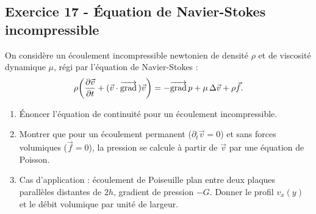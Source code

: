 \documentclass[12pt,a4paper]{article}
\begin{document}
\subsection*{Exercice 17 - Équation de Navier-Stokes incompressible \niveau{\difficile}}

\begin{boiteexercice}
On considère un écoulement incompressible newtonien de densité $\rho$ et de viscosité dynamique $\mu$, régi par l'équation de Navier-Stokes :
\[
\rho\!\left(\frac{\partial\vec{v}}{\partial t} + (\vec{v}\cdot\overrightarrow{\mathrm{grad}}\,)\vec{v}\right) = -\overrightarrow{\mathrm{grad}}\, p + \mu\,\Delta\vec{v} + \rho\vec{f}.
\]
\begin{enumerate}
  \item Énoncer l'équation de continuité pour un écoulement incompressible.
  \item Montrer que pour un écoulement permanent ($\partial_t\vec{v}=0$) et sans forces volumiques ($\vec{f}=0$), la pression se calcule à partir de $\vec{v}$ par une équation de Poisson.
  \item Cas d'application : écoulement de Poiseuille plan entre deux plaques parallèles distantes de $2h$, gradient de pression $-G$. Donner le profil $v_x(y)$ et le débit volumique par unité de largeur.
\end{enumerate}
\end{boiteexercice}
\end{document}
